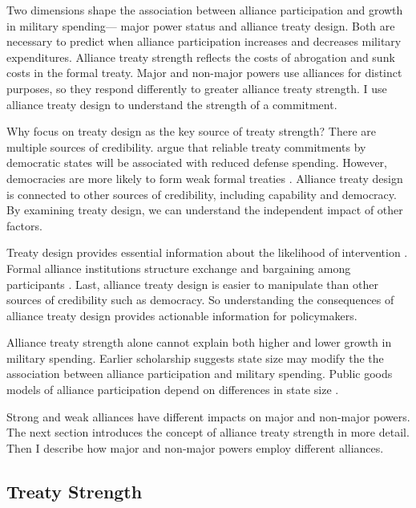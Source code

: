\documentclass[12pt]{article}
\begin{document}
Two dimensions shape the association between alliance participation and growth in military spending--- major power status and alliance treaty design. 
Both are necessary to predict when alliance participation increases and decreases military expenditures. 
Alliance treaty strength reflects the costs of abrogation and sunk costs in the formal treaty. 
Major and non-major powers use alliances for distinct purposes, so they respond differently to greater alliance treaty strength. 
I use alliance treaty design to understand the strength of a commitment.


Why focus on treaty design as the key source of treaty strength? 
There are multiple sources of credibility. 
\citet{DigiuseppePoast2016} argue that reliable treaty commitments by democratic states will be associated with reduced defense spending. 
However, democracies are more likely to form weak formal treaties \citep{Mattes2012}. 
Alliance treaty design is connected to other sources of credibility, including capability and democracy. 
By examining treaty design, we can understand the independent impact of other factors. 


Treaty design provides essential information about the likelihood of intervention \citep{Morrow2000, Leeds2003}. 
Formal alliance institutions structure exchange and bargaining among participants \citep{Williamson1985, North1990, DiermeierKrehbiel2003}.
Last, alliance treaty design is easier to manipulate than other sources of credibility such as democracy. 
So understanding the consequences of alliance treaty design provides actionable information for policymakers. 


Alliance treaty strength alone cannot explain both higher and lower growth in military spending. 
Earlier scholarship suggests state size may modify the the association between alliance participation and military spending. 
Public goods models of alliance participation depend on differences in state size \citep{OlsonZeckhauser1966, DudleyMontmarquette1981, Garfinkel2004}.  


Strong and weak alliances have different impacts on major and non-major powers.
The next section introduces the concept of alliance treaty strength in more detail. 
Then I describe how major and non-major powers employ different alliances. 


\subsection{Treaty Strength} 
\end{document}
